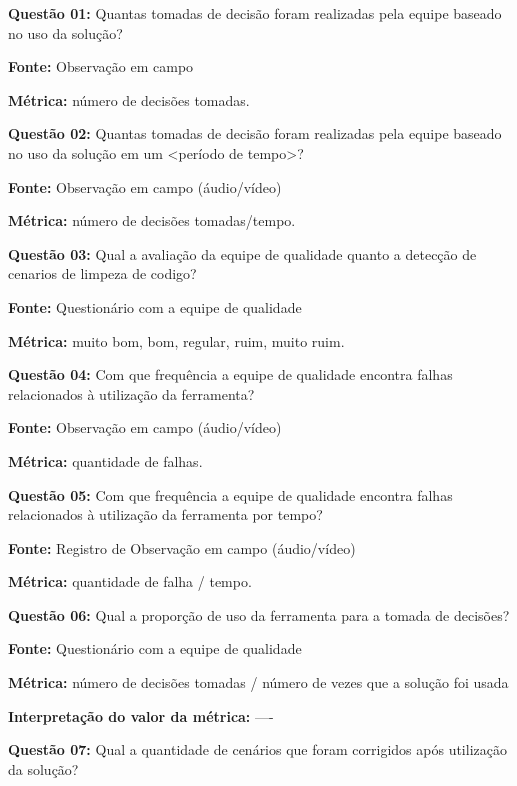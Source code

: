 \textbf{Questão 01:} Quantas tomadas de decisão foram realizadas pela equipe baseado no uso da solução?

\textbf{Fonte:} Observação em campo

\textbf{Métrica:} número de decisões tomadas. \newline

\textbf{Questão 02:} Quantas tomadas de decisão foram realizadas pela equipe baseado no uso da solução em um <período de tempo>?

\textbf{Fonte:} Observação em campo (áudio/vídeo)

\textbf{Métrica:} número de decisões tomadas/tempo. \newline


\textbf{Questão 03:} Qual a avaliação da equipe de qualidade quanto a detecção de cenarios de limpeza de codigo?

\textbf{Fonte:} Questionário com a equipe de qualidade

\textbf{Métrica:} muito bom, bom, regular, ruim, muito ruim. \newline


\textbf{Questão 04:} Com que frequência a equipe de qualidade encontra falhas relacionados à utilização da ferramenta?

\textbf{Fonte:} Observação em campo (áudio/vídeo)

\textbf{Métrica:} quantidade de falhas. \newline


\textbf{Questão 05:} Com que frequência a equipe de qualidade encontra falhas relacionados à utilização da ferramenta por tempo?

\textbf{Fonte:} Registro de Observação em campo (áudio/vídeo)

\textbf{Métrica:} quantidade de falha / tempo. \newline



\textbf{Questão 06:} Qual a proporção de uso da ferramenta para a tomada de decisões?

\textbf{Fonte:} Questionário com a equipe de qualidade

\textbf{Métrica:} número de decisões tomadas / número de vezes que a solução foi usada 

\textbf{Interpretação do valor da métrica:} ---- \newline



\textbf{Questão 07:} Qual a quantidade de cenários que foram corrigidos após utilização da solução?

